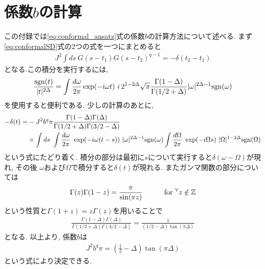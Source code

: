 \section{係数$b$の計算 \label{app:b}}
	
	この付録では\eqref{eq:conformal_ansatz}式の係数$b$の計算方法について述べる.
	まず\eqref{eq:conformalSD}式の2つの式を一つにまとめると
	\begin{align}
		J^2\int ds\ G(s - t_1)G(s - t_2)^{q - 1} = -\delta(t_2 - t_1)
		\label{eq:intOfGG}
	\end{align}
	となる.この積分を実行するには, 
	\begin{align}
	\frac{\sgn(t)}{|t|^{2\Delta}} = 
		\int \frac{d\omega}{2\pi}\exp(-i\omega t)\ 
		i\, 2^{1 - 2\Delta}\sqrt{\pi}\frac{\Gamma(1 - \Delta)}{\Gamma(1/2 + \Delta)}
		|\omega|^{2\Delta - 1}\sgn(\omega)
	\end{align}
	を使用すると便利である.
	少しの計算のあとに, 
	\begin{align}
	-\delta(t) = &-J^2b^q\pi
		\frac{\Gamma(1 - \Delta)\Gamma(\Delta)}{\Gamma(1/2 + \Delta)\Gamma(3/2 - \Delta)}
		\nonumber\\
		&\times \int ds\ 
		\int \frac{d\omega}{2\pi}\ \exp(-i\omega(t - s))\ |\omega|^{2\Delta - 1}\sgn(\omega)
		\int \frac{d\Omega}{2\pi}\ \exp(-i\Omega s)\ |\Omega|^{1 - 2\Delta}\sgn(\Omega)
	\end{align}
	という式にたどり着く. 
	積分の部分は最初に$s$について実行すると$\delta(\omega - \Omega)$が現れ, その後
	$\omega$および$\Omega$で積分すると$\delta(t)$が現れる. 
	またガンマ関数の部分については
	\begin{align}
	\Gamma(z)\Gamma(1 - z) = \frac{\pi}{\sin(\pi z)}
	\hspace{30pt}
	{\rm for}\ {}^{\forall}z \notin \mathbb{Z}
	\end{align}
	という性質と$\Gamma(1 + z) = z\Gamma(z)$を用いることで
	\begin{align}
	\frac{\Gamma(1 - \Delta)\Gamma(\Delta)}{\Gamma(1/2 + \Delta)\Gamma(3/2 - \Delta)}
	= \frac{1}{(1/2 - \Delta) \tan(\pi\Delta)}
	\end{align}
	となる. 以上より, 係数$b$は
	\begin{align}
		J^2b^q\pi = \left(\frac{1}{2} - \Delta\right)\tan(\pi\Delta)
	\end{align}
	という式により決定できる. 
	
	\pagebreak